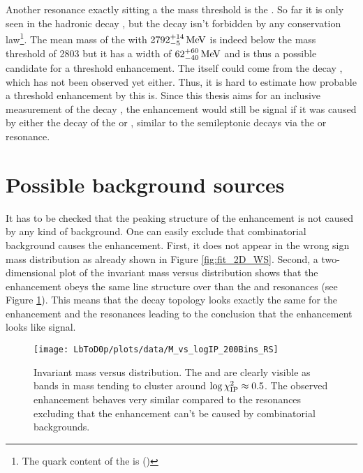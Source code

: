 Another resonance exactly sitting a the \Dz\proton mass threshold is the .
So far it is only seen in the hadronic decay , but the decay  isn't forbidden by any conservation law\footnote{The quark content of the  is (\uquark\dquark\cquark)}.
The mean mass of the  with $2792^{+14}_{-5}\mathrm{\,Me\kern -0.1em V}$ is indeed below the \Dz\proton mass threshold of 2803 \mev but it has a width of $62^{+60}_{-40}\mathrm{\,Me\kern -0.1em V}$ \cite{PDG} and is thus a possible candidate for a threshold enhancement.
The  itself could come from the decay , which has not been observed yet either.
Thus, it is hard to estimate how probable a threshold enhancement by this  is.
Since this thesis aims for an inclusive measurement of the decay \LbToDpmunuX, the enhancement would still be signal if it was caused by either the decay of the  or , similar to the semileptonic \Lb decays via the \LcResI or \LcResII resonance.

\section{Possible background sources}
It has to be checked that the peaking structure of the enhancement is not caused by any kind of background.
One can easily exclude that combinatorial background causes the enhancement.
First, it does not appear in the wrong sign \Dz\proton mass distribution as already shown in Figure \ref{fig:fit_2D_WS}.
Second, a two-dimensional plot of the invariant \Dz\proton mass versus \logIP distribution shows that the enhancement obeys the same line structure over \logIP than the \LcResI and \LcResII resonances (see Figure \ref{fig:plot_M_vs_logIP}).
This means that the decay topology looks exactly the same for the enhancement and the resonances leading to the conclusion that the enhancement looks like signal.
\begin{figure}[tb]
	\centering
	\texttt{[image: LbToD0p/plots/data/M\_vs\_logIP\_200Bins\_RS]}
	\caption{Invariant \Dz\proton mass versus \logIP distribution. The \LcResI and \LcResII are clearly visible as bands in \Dz\proton mass tending to cluster around $\log \chi^2_{\text{IP}} \approx 0.5$. The observed enhancement behaves very similar compared to the resonances excluding that the enhancement can't be caused by combinatorial backgrounds.}
	\label{fig:plot_M_vs_logIP}
\end{figure}

